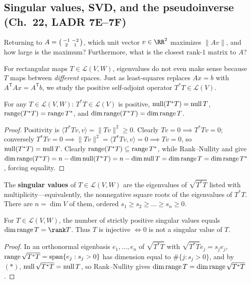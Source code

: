 \documentclass[10pt]{scrartcl}
\newcommand{\LL}{\mathcal L}\newcommand{\PP}{\mathcal P}\newcommand{\MM}{\mathcal M}
\begin{document}
\subsection{Singular values, SVD, and the pseudoinverse (Ch.~22, LADR 7E--7F)}

\begin{qbox}
  Returning to $A=\begin{psmallmatrix}-1&-2\\2&1\end{psmallmatrix}$, which unit vector $v\in\RR^2$ maximizes $\|Av\|$, and how large is the maximum? Furthermore, what is the closest rank-$1$ matrix to $A$?
\end{qbox}

For rectangular maps $T\in\LL(V,W)$, eigenvalues do not even make sense because $T$ maps between \emph{different} spaces. Just as least-squares replaces $Ax=b$ with $A^{\mathsf T}Ax=A^{\mathsf T}b$, we study the positive self-adjoint operator $T^*T\in\LL(V)$.

\begin{proposition*}
  For any $T\in\LL(V,W)$: $T^*T\in\LL(V)$ is positive, $\operatorname{null}(T^*T)=\operatorname{null} T$, $\operatorname{range}(T^*T)=\operatorname{range} T^*$, and $\dim\operatorname{range}(T^*T)=\dim\operatorname{range} T$.
\end{proposition*}
\begin{proof}
  Positivity is $\langle T^*Tv,v\rangle=\|Tv\|^2\ge0$. Clearly $Tv=0\implies T^*Tv=0$; conversely $T^*Tv=0\implies \|Tv\|^2=\langle T^*Tv,v\rangle=0\implies Tv=0$, so $\operatorname{null}(T^*T)=\operatorname{null} T$. Clearly $\operatorname{range}(T^*T)\subseteq\operatorname{range} T^*$, while Rank--Nullity  and  give $\dim\operatorname{range}(T^*T)=n-\dim\operatorname{null}(T^*T)=n-\dim\operatorname{null} T=\dim\operatorname{range} T=\dim\operatorname{range} T^*$, forcing equality.
\end{proof}

\begin{definition*}
  The \textbf{singular values} of $T\in\LL(V,W)$ are the eigenvalues of $\sqrt{T^*T}$ listed with multiplicity---equivalently, the nonnegative square roots of the eigenvalues of $T^*T$. There are $n=\dim V$ of them, ordered $s_1\ge s_2\ge\dots\ge s_n\ge0$.
\end{definition*}

\begin{proposition*}
  For $T\in\LL(V,W)$, the number of strictly positive singular values equals $\dim\range T=\rank T$. Thus $T$ is injective $\iff 0$ is not a singular value of $T$.
\end{proposition*}
\begin{proof}
  In an orthonormal eigenbasis $e_1,\dots,e_n$ of $\sqrt{T^*T}$ with $\sqrt{T^*T}e_j=s_je_j$, $\operatorname{range}\sqrt{T^*T}=\operatorname{span}\{e_j:s_j>0\}$ has dimension equal to $\#\{j:s_j>0\}$, and by $(\ast)$, $\operatorname{null}\sqrt{T^*T}=\operatorname{null} T$, so Rank--Nullity gives $\dim\operatorname{range} T=\dim\operatorname{range}\sqrt{T^*T}$.
\end{proof}
\end{document}
